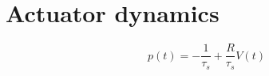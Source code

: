 \section{Actuator dynamics}




\begin{equation}
    p(t) = -\frac{1}{\tau_s} + \frac{R}{\tau_s}V(t)
\end{equation}








